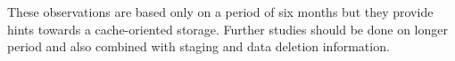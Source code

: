 

These observations are based only on a period of six months but they provide hints towards a cache-oriented storage. Further studies should be done on longer period and also combined with staging and data deletion information. 
